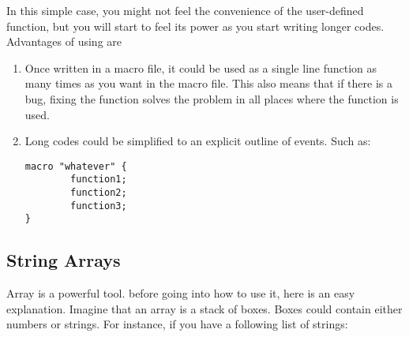 In this simple case, 
you might not feel the convenience of the user-defined function, 
but you will start to feel its power as you start writing longer codes. 
Advantages of using  are

\begin{enumerate}
\item Once written in a macro file, it could be used as a single line function 
as many times as you want in the macro file. This also means that if there is a bug, 
fixing the function solves the problem in all places where the function is used.
\item Long codes could be simplified to an explicit outline of events. Such as:
\begin{lstlisting}[numbers=none]
macro "whatever" {
    	function1;
		function2;
		function3;
}
\end{lstlisting}
\end{enumerate}

\subsection{String Arrays}
Array is a powerful tool. before going into how to use it, here is an easy explanation. 
Imagine that an array is a stack of boxes. Boxes could contain either numbers or strings. 
For instance, if you have a following list of strings: